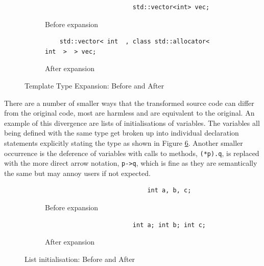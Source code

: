 \documentclass[bsc,frontabs,singlespacing,parskip,deptreport]{infthesis}
\begin{document}
\begin{figure}[H]
    \centering
    \begin{subfigure}[h]{\textwidth}
        \centering
        \begin{verbatim}
                        std::vector<int> vec;
        \end{verbatim}
        \caption{Before expansion}
        \label{fig:temp-expand-before}
        \vspace{0.40cm}
    \end{subfigure}
    \begin{subfigure}[h]{\textwidth}
        \centering
        \begin{verbatim}
    std::vector< int  , class std::allocator< int  >  > vec;
        \end{verbatim}
        \caption{After expansion}
        \label{fig:temp-expand-after}
    \end{subfigure}
    
    \caption{Template Type Expansion: Before and After}
    \label{fig:temp-expand}
\end{figure}

There are a number of smaller ways that the transformed source code can differ from the original code, most are harmless and are equivalent to the original. An example of this divergence are lists of initialisations of variables. The variables all being defined with the same type get broken up into individual declaration statements explicitly stating the type as shown in Figure \ref{fig:list-init}. Another smaller occurrence is the deference of variables with calls to methods, \texttt{(*p).q}, is replaced with the more direct arrow notation, \texttt{p->q}, which is fine as they are semantically the same but may annoy users if not expected. 

\begin{figure}[!h]
    \centering
    \begin{subfigure}[h]{\textwidth}
        \centering
        \begin{verbatim}
                            int a, b, c;
        \end{verbatim}
        \caption{Before expansion}
        \label{fig:list-init-before}
        \vspace{0.40cm}
    \end{subfigure}
    \begin{subfigure}[h]{\textwidth}
        \centering
        \begin{verbatim}
                        int a; int b; int c;
        \end{verbatim}
        \caption{After expansion}
        \label{fig:list-init-after}
    \end{subfigure}
    \caption{List initialisation: Before and After}
    \label{fig:list-init}
\end{figure}
\end{document}
